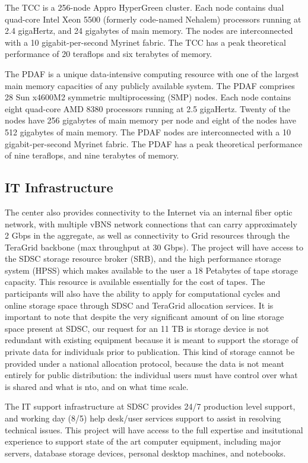 The TCC is a 256-node Appro HyperGreen cluster. Each node contains
dual quad-core Intel Xeon 5500 (formerly code-named Nehalem)
processors running at 2.4 gigaHertz, and 24 gigabytes of main memory.
The nodes are interconnected with a 10 gigabit-per-second Myrinet
fabric. The TCC has a peak theoretical performance of 20 teraflops and
six terabytes of memory.

The PDAF is a unique data-intensive computing resource with one of the
largest main memory capacities of any publicly available system. The
PDAF comprises 28 Sun x4600M2 symmetric multiprocessing (SMP) nodes.
Each node contains eight quad-core AMD 8380 processors running at 2.5
gigaHertz. Twenty of the nodes have 256 gigabytes of main memory per
node and eight of the nodes have 512 gigabytes of main memory. The
PDAF nodes are interconnected with a 10 gigabit-per-second Myrinet
fabric. The PDAF has a peak theoretical performance of nine teraflops,
and nine terabytes of memory.

\subsection{IT Infrastructure}

The center also provides connectivity to the Internet via an internal
fiber optic network, with multiple vBNS network connections that can
carry approximately 2 Gbps in the aggregate, as well as connectivity
to Grid resources through the TeraGrid backbone (max throughput at 30
Gbps). The project will have access to the SDSC storage resource
broker (SRB), and the high performance storage system (HPSS) which
makes available to the user a 18 Petabytes of tape storage capacity.
This resource is available essentially for the cost of tapes. The
participants will also have the ability to apply for computational
cycles and online storage space through SDSC and TeraGrid allocation
services. It is important to note that despite the very significant
amount of on line storage space present at SDSC, our request for an 11
TB is storage device is not redundant with existing equipment because
it is meant to support the storage of private data for individuals
prior to publication. This kind of storage cannot be provided under a
national allocation protocol, because the data is not meant entirely
for public distribution: the individual users must have control over
what is shared and what is nto, and on what time scale.

 
The IT support infrastructure at SDSC provides 24/7 production level
support, and working day (8/5) help desk/user services support to
assist in resolving technical issues. This project will have access to
the full expertise and insitutional experience to support state of the
art computer equipment, including major servers, database storage
devices, personal desktop machines, and notebooks.

